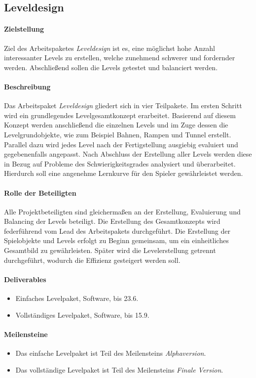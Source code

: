 \subsection{Leveldesign}
\label{ap5}

\paragraph{Zielstellung}\noindent
Ziel des Arbeitspaketes \textit{Leveldesign} ist es, eine möglichst hohe Anzahl interessanter Levels zu erstellen, welche zunehmend schwerer und fordernder werden. Abschließend sollen die Levels getestet und balanciert werden.

\paragraph{Beschreibung}\noindent
Das Arbeitspaket \textit{Leveldesign} gliedert sich in vier Teilpakete. Im ersten Schritt wird ein grundlegendes Levelgesamtkonzept erarbeitet. Basierend auf diesem Konzept werden anschließend die einzelnen Levels und im Zuge dessen die Levelgrundobjekte, wie zum Beispiel Bahnen, Rampen und Tunnel erstellt. Parallel dazu wird jedes Level nach der Fertigstellung ausgiebig evaluiert und gegebenenfalls angepasst. Nach Abschluss der Erstellung aller Levels werden diese in Bezug auf Probleme des Schwierigkeitsgrades analysiert und überarbeitet. Hierdurch soll eine angenehme Lernkurve für den Spieler gewährleistet werden.

\paragraph{Rolle der Beteiligten}\noindent
Alle Projektbeteiligten sind gleichermaßen an der Erstellung, Evaluierung und Balancing der Levels beteiligt. Die Erstellung des Gesamtkonzepts wird federführend vom Lead des Arbeitspakets durchgeführt. Die Erstellung der Spielobjekte und Levels erfolgt zu Beginn gemeinsam, um ein einheitliches Gesamtbild zu gewährleisten. Später wird die Levelerstellung getrennt durchgeführt, wodurch die Effizienz gesteigert werden soll.

\paragraph{Deliverables}\noindent
\begin{itemize}
\item Einfaches Levelpaket, Software, bis 23.6.
\item Vollständiges Levelpaket, Software, bis 15.9.
\end{itemize}

\paragraph{Meilensteine}\noindent
\begin{itemize}
\item Das einfache Levelpaket ist Teil des Meilensteins \textit{Alphaversion}.
\item Das vollständige Levelpaket ist Teil des Meilensteins \textit{Finale Version}.
\end{itemize}